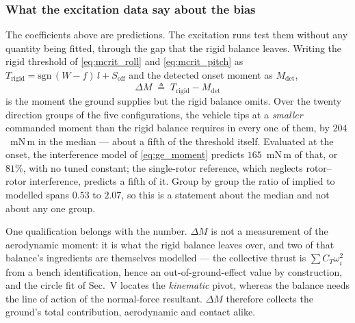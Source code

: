 %

\subsubsection{What the excitation data say about the bias}

The coefficients above are predictions. The excitation runs test them
without any quantity being fitted, through the gap that the rigid
balance leaves. Writing the rigid threshold of
\eqref{eq:mcrit_roll} and \eqref{eq:mcrit_pitch} as
$T_{\mathrm{rigid}} = \mathrm{sgn}\,(W - f)\,l + S_{\mathrm{off}}$ and
the detected onset moment as $M_{\mathrm{det}}$,
\begin{equation}
\Delta M \;\triangleq\; T_{\mathrm{rigid}} - M_{\mathrm{det}}
\label{eq:gap}
\end{equation}
is the moment the ground supplies but the rigid balance omits. Over
the twenty direction groups of the five configurations, the vehicle
tips at a \emph{smaller} commanded moment than the rigid balance
requires in every one of them, by $204$~mN\,m in the median --- about
a fifth of the threshold itself. Evaluated at the onset, the
interference model of \eqref{eq:ge_moment} predicts $165$~mN\,m of
that, or $81\%$, with no tuned constant; the single-rotor reference,
which neglects rotor--rotor interference, predicts a fifth of it.
Group by group the ratio of implied to modelled spans $0.53$ to
$2.07$, so this is a statement about the median and not about any one
group.

One qualification belongs with the number. $\Delta M$ is not a
measurement of the aerodynamic moment: it is what the rigid balance
leaves over, and two of that balance's ingredients are themselves
modelled --- the collective thrust is $\sum C_T \omega_i^2$ from a
bench identification, hence an out-of-ground-effect value by
construction, and the circle fit of Sec.~V locates the
\emph{kinematic} pivot, whereas the balance needs the line of action
of the normal-force resultant. $\Delta M$ therefore collects the
ground's total contribution, aerodynamic and contact alike.

